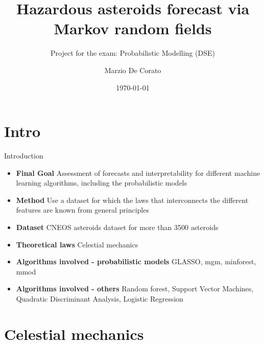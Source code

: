 \documentclass{beamer}
\title[Hazardous asteroids forecast via Markov random fields]{Hazardous asteroids forecast via Markov random fields}
\subtitle{Project for the exam: Probabilistic Modelling (DSE)}
\author{Marzio De Corato}
\date{\today}
\begin{document}
\begin{frame}
\vspace{+4 cm}  \titlepage
\end{frame}

\usebackgroundtemplate{ } 


\section{Intro}

\begin{frame}{Introduction}

\begin{itemize}
\item \textbf{Final Goal} Assessment of forecasts and interpretability for different machine learning algorithms, including the probabilistic models
\item \textbf{Method} Use a dataset for which the laws that interconnects the different features are known from general principles
\item \textbf{Dataset} CNEOS asteroids dataset for more than 3500 asteroids
\item \textbf{Theoretical laws} Celestial mechanics
\item \textbf{Algorithms involved - probabilistic models} GLASSO, mgm, minforest, mmod
\item \textbf{Algorithms involved - others} Random forest, Support Vector Machines, Quadratic Discriminant Analysis, Logistic Regression  

\end{itemize} 

\end{frame}

\section{Celestial mechanics}
\end{document}
